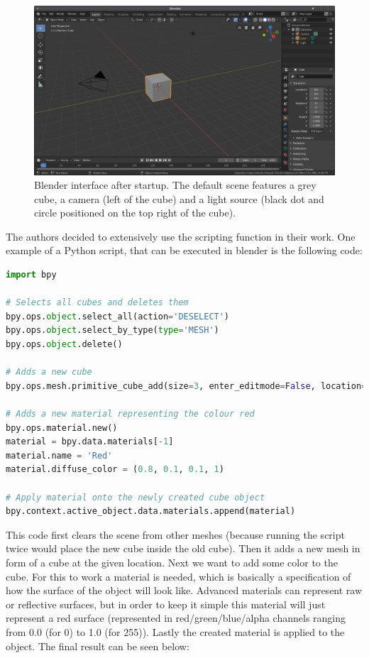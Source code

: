 \begin{figure}[h!]
	\centering
	\includegraphics[width=6.5in]{img/methodology_generatingData_blender_startscreen.png}
	\caption{Blender interface after startup. The default scene features a grey cube, a camera (left of the cube) and a light source (black dot and circle positioned on the top right of the cube).}
	\label{pic:methodology_generatingData_blender_startscreen}
\end{figure}

The authors decided to extensively use the scripting function in their work. One example of a Python script, that can be executed in blender is the following code:

\begin{lstlisting}[language=python]
import bpy

# Selects all cubes and deletes them
bpy.ops.object.select_all(action='DESELECT')
bpy.ops.object.select_by_type(type='MESH')
bpy.ops.object.delete()

# Adds a new cube
bpy.ops.mesh.primitive_cube_add(size=3, enter_editmode=False, location=(4, 2, 0))

# Adds a new material representing the colour red
bpy.ops.material.new()
material = bpy.data.materials[-1]
material.name = 'Red'
material.diffuse_color = (0.8, 0.1, 0.1, 1)

# Apply material onto the newly created cube object
bpy.context.active_object.data.materials.append(material)
\end{lstlisting}

This code first clears the scene from other meshes (because running the script twice would place the new cube inside the old cube). Then it adds a new mesh in form of a cube at the given location. Next we want to add some color to the cube. For this to work a material is needed, which is basically a specification of how the surface of the object will look like. Advanced materials can represent raw or reflective surfaces, but in order to keep it simple this material will just represent a red surface (represented in red/green/blue/alpha channels ranging from 0.0 (for 0) to 1.0 (for 255)). Lastly the created material is applied to the object. The final result can be seen below:

